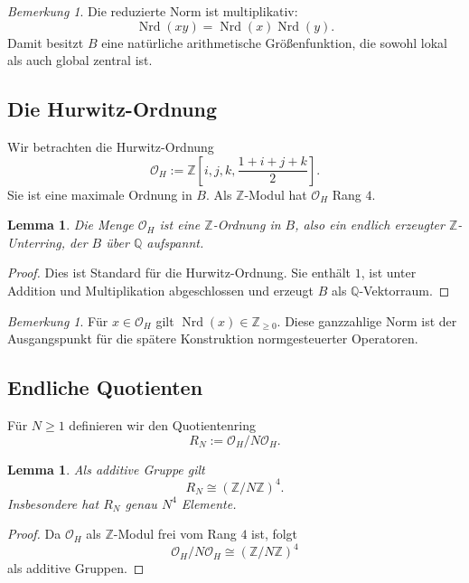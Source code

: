 \documentclass[12pt,a4paper]{article}
\theoremstyle{plain}
\newtheorem{lemma}[satz]{Lemma}
\theoremstyle{definition}
\theoremstyle{remark}
\newtheorem{bemerkung}[satz]{Bemerkung}
\newcommand{\Q}{\mathbb{Q}}
\newcommand{\Z}{\mathbb{Z}}
\newcommand{\OH}{\mathcal{O}_H}
\newcommand{\Nrd}{\operatorname{Nrd}}
\begin{document}
	\begin{bemerkung}
		Die reduzierte Norm ist multiplikativ:
		\[
		\Nrd(xy)=\Nrd(x)\Nrd(y).
		\]
		Damit besitzt \(B\) eine natürliche arithmetische Größenfunktion,
		die sowohl lokal als auch global zentral ist.
	\end{bemerkung}
	
	\subsection{Die Hurwitz-Ordnung}
	
	Wir betrachten die Hurwitz-Ordnung
	\[
	\OH := \Z\!\left[i,j,k,\frac{1+i+j+k}{2}\right].
	\]
	Sie ist eine maximale Ordnung in \(B\).
	Als \(\Z\)-Modul hat \(\OH\) Rang \(4\).
	
	\begin{lemma}
		Die Menge \(\OH\) ist eine \(\Z\)-Ordnung in \(B\), also ein
		endlich erzeugter \(\Z\)-Unterring, der \(B\) über \(\Q\) aufspannt.
	\end{lemma}
	
	\begin{proof}
		Dies ist Standard für die Hurwitz-Ordnung.
		Sie enthält \(1\), ist unter Addition und Multiplikation abgeschlossen
		und erzeugt \(B\) als \(\Q\)-Vektorraum.
	\end{proof}
	
	\begin{bemerkung}
		Für \(x\in \OH\) gilt \(\Nrd(x)\in \Z_{\ge 0}\).
		Diese ganzzahlige Norm ist der Ausgangspunkt für die spätere
		Konstruktion normgesteuerter Operatoren.
	\end{bemerkung}
	
	\subsection{Endliche Quotienten}
	
	Für \(N\ge 1\) definieren wir den Quotientenring
	\[
	R_N := \OH/N\OH.
	\]
	
	\begin{lemma}
		Als additive Gruppe gilt
		\[
		R_N \cong (\Z/N\Z)^4.
		\]
		Insbesondere hat \(R_N\) genau \(N^4\) Elemente.
	\end{lemma}
	
	\begin{proof}
		Da \(\OH\) als \(\Z\)-Modul frei vom Rang \(4\) ist,
		folgt
		\[
		\OH/N\OH \cong (\Z/N\Z)^4
		\]
		als additive Gruppen.
	\end{proof}
	
\end{document}
